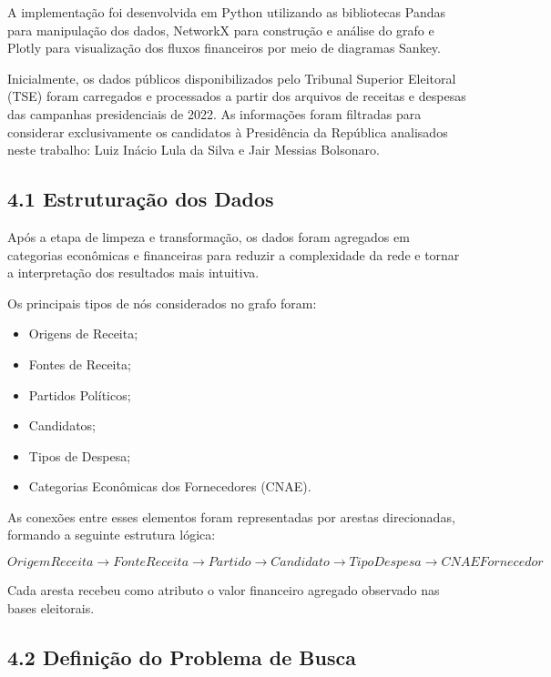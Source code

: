 \documentclass[11pt]{article}
\providecommand{\tightlist}{%
      \setlength{\itemsep}{0pt}\setlength{\parskip}{0pt}}
\begin{document}
A implementação foi desenvolvida em Python utilizando as bibliotecas
Pandas para manipulação dos dados, NetworkX para construção e análise do
grafo e Plotly para visualização dos fluxos financeiros por meio de
diagramas Sankey.

Inicialmente, os dados públicos disponibilizados pelo Tribunal Superior
Eleitoral (TSE) foram carregados e processados a partir dos arquivos de
receitas e despesas das campanhas presidenciais de 2022. As informações
foram filtradas para considerar exclusivamente os candidatos à
Presidência da República analisados neste trabalho: Luiz Inácio Lula da
Silva e Jair Messias Bolsonaro.

\subsection{4.1 Estruturação dos
Dados}\label{estruturauxe7uxe3o-dos-dados}

Após a etapa de limpeza e transformação, os dados foram agregados em
categorias econômicas e financeiras para reduzir a complexidade da rede
e tornar a interpretação dos resultados mais intuitiva.

Os principais tipos de nós considerados no grafo foram:

\begin{itemize}
\tightlist
\item
  Origens de Receita;
\item
  Fontes de Receita;
\item
  Partidos Políticos;
\item
  Candidatos;
\item
  Tipos de Despesa;
\item
  Categorias Econômicas dos Fornecedores (CNAE).
\end{itemize}

As conexões entre esses elementos foram representadas por arestas
direcionadas, formando a seguinte estrutura lógica:

\[
OrigemReceita
\rightarrow
FonteReceita
\rightarrow
Partido
\rightarrow
Candidato
\rightarrow
TipoDespesa
\rightarrow
CNAEFornecedor
\]

Cada aresta recebeu como atributo o valor financeiro agregado observado
nas bases eleitorais.

\subsection{4.2 Definição do Problema de
Busca}\label{definiuxe7uxe3o-do-problema-de-busca}
\end{document}
